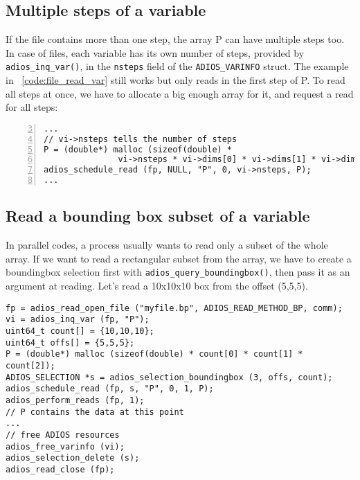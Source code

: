 \subsection{Multiple steps of a variable}
 If the file contains more than one step, the array P can have multiple steps too. In case of files, each variable has its own number of steps, provided by \verb+adios_inq_var()+, in the \verb+nsteps+ field of the \verb+ADIOS_VARINFO+ struct. The example in \lstlistingname~\ref{code:file_read_var} still works but only reads in the first step of P. To read all steps at once, we have to allocate a big enough array for it, and request a read for all steps:

\begin{lstlisting}[frame=no, emph={nsteps}, emphstyle={\color{red}\large\bf},
                             numbers=left, numberstyle=\color{gray}, stepnumber=2,firstnumber=3]
...
// vi->nsteps tells the number of steps
P = (double*) malloc (sizeof(double) * 
               vi->nsteps * vi->dims[0] * vi->dims[1] * vi->dims[2]);
adios_schedule_read (fp, NULL, "P", 0, vi->nsteps, P);
...
\end{lstlisting}


\subsection{Read a bounding box subset of a variable}
In parallel codes, a process usually wants to read only a subset of the whole array. If we want to read a rectangular subset from the array, we have to create a boundingbox selection first with \verb+adios_query_boundingbox()+, then pass it as an argument at reading. Let's read a 10x10x10 box from the offset (5,5,5). 


\begin{lstlisting}[numbers=none,
                             caption={Read a bounding box of a variable},  label=code:boundingbox]
fp = adios_read_open_file ("myfile.bp", ADIOS_READ_METHOD_BP, comm);
vi = adios_inq_var (fp, "P");
uint64_t count[] = {10,10,10};
uint64_t offs[] = {5,5,5};
P = (double*) malloc (sizeof(double) * count[0] * count[1] * count[2]);
ADIOS_SELECTION *s = adios_selection_boundingbox (3, offs, count);
adios_schedule_read (fp, s, "P", 0, 1, P);
adios_perform_reads (fp, 1);   
// P contains the data at this point
...
// free ADIOS resources
adios_free_varinfo (vi); 
adios_selection_delete (s); 
adios_read_close (fp);
\end{lstlisting}


